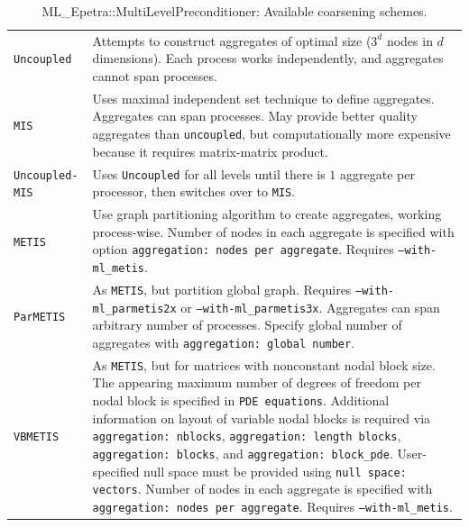 \documentclass{article}[11pt]
\begin{document}
\begin{table}[tbh]
\begin{center}
\begin{tabular}{ | p{4cm} | p{10cm} | }
\hline
\verb!Uncoupled! & Attempts to construct
aggregates of optimal size ($3^d$ nodes in $d$ dimensions).
Each process works independently, and aggregates cannot span processes.\\
\verb!MIS! & Uses maximal independent set technique \cite{supercomputing}
to define aggregates. Aggregates can span
processes. May provide better quality aggregates than
\verb!uncoupled!, but computationally more expensive because it
requires matrix-matrix product. \\
%
\verb!Uncoupled-MIS! & Uses \verb!Uncoupled! for all levels until there is $1$
aggregate per processor,  then switches over to \verb!MIS!.\\
%
\verb!METIS! & Use graph partitioning algorithm to create
aggregates, working process-wise. Number of nodes in each aggregate
is specified with option {\tt aggregation: nodes per aggregate}.
Requires {\tt --with-ml\_metis}.\\
\verb!ParMETIS! & As \verb!METIS!, but partition global
graph. Requires {\tt --with-ml\_parmetis2x} or {\tt --with-ml\_parmetis3x}. Aggregates can span
arbitrary number of processes. Specify global number of aggregates
with {\tt aggregation: global number}. \\
\verb!VBMETIS! & As \verb!METIS!, but for matrices with nonconstant
nodal block size.
The appearing maximum number of degrees of freedom per nodal block is specified
in {\tt PDE equations}. Additional information on layout of variable nodal blocks 
is required via
{\tt aggregation: nblocks},
{\tt aggregation: length blocks},
{\tt aggregation: blocks}, and
{\tt aggregation: block\_pde}.
User-specified null space must be provided using
{\tt null space: vectors}.
Number of nodes in each aggregate
is specified with {\tt aggregation: nodes per aggregate}.
Requires {\tt --with-ml\_metis}.\\
\hline
\end{tabular}
\caption{ML\_Epetra::MultiLevelPreconditioner: Available coarsening schemes.}
\label{tab:ml:aggr}
\end{center}
\end{table}
\end{document}
